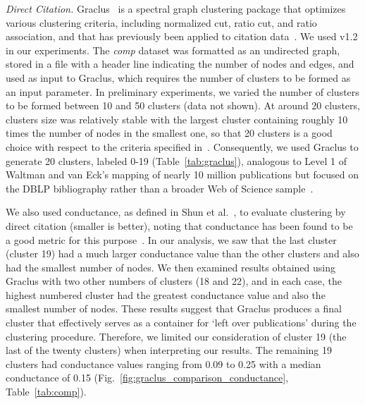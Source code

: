 \emph{Direct Citation.} Graclus~\cite{graclus_2007} is a spectral graph clustering package that optimizes  various clustering criteria, including normalized cut, ratio cut, and ratio association, and that has previously been applied to citation data~\cite{subelj_clustering_2016}. We used v1.2 in our experiments. The \emph{comp} dataset was formatted as an undirected graph, stored in a file with a header line indicating the number of nodes and edges, and used as input to Graclus, which requires the number of clusters to be formed as an input parameter. In preliminary experiments, we varied the number of clusters to be formed between 10 and 50 clusters (data not shown).  At around 20 clusters, clusters size was relatively stable with the largest cluster containing roughly 10 times the number of nodes in the smallest one,
so that 20 clusters is a good choice with respect to the criteria specified in~\cite{subelj_clustering_2016}. Consequently, we used Graclus to generate 20 clusters, labeled 0-19 (Table~\ref{tab:graclus}), analogous to Level 1 of Waltman and van Eck's mapping of nearly 10 million publications but focused on the DBLP bibliography rather than a broader Web of Science sample~\cite{waltman_new_2012}. 

We also used conductance, as defined in Shun et al.~\cite{shun_parallel_2016}, to  evaluate clustering by direct citation (smaller is better), noting that conductance has been found to be a good metric for this purpose~\cite{emmons2016analysis,almeida_2012}. In our analysis, we saw that the last cluster (cluster 19) had a much larger conductance value than the other clusters and also had the smallest number of nodes. We then examined results obtained using Graclus with two other numbers of clusters (18 and 22), and in each case, the highest numbered cluster had the greatest conductance value and also the smallest number of nodes. These results suggest that Graclus produces a final cluster that effectively serves as a container for `left over publications' during the clustering procedure. Therefore, we limited our consideration of cluster 19 (the last of the twenty clusters)  when interpreting our results.  The remaining 19 clusters had conductance values ranging from 0.09 to 0.25 with a median conductance of 0.15 (Fig.~\ref{fig:graclus_comparison_conductance}, Table~\ref{tab:comp}).

